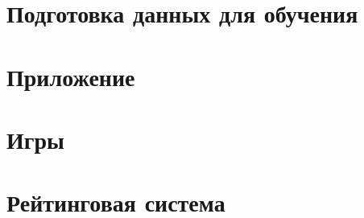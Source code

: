 

\section{Подготовка данных для обучения}




\section{Приложение}



\section{Игры}



\section{Рейтинговая система}















